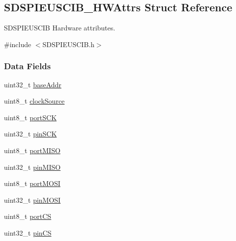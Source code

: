 \subsection{S\+D\+S\+P\+I\+E\+U\+S\+C\+I\+B\+\_\+\+H\+W\+Attrs Struct Reference}
\label{struct_s_d_s_p_i_e_u_s_c_i_b___h_w_attrs}


S\+D\+S\+P\+I\+E\+U\+S\+C\+I\+B Hardware attributes.  




{\ttfamily \#include $<$S\+D\+S\+P\+I\+E\+U\+S\+C\+I\+B.\+h$>$}

\subsubsection*{Data Fields}
\begin{DoxyCompactItemize}
\item 
uint32\+\_\+t \hyperlink{struct_s_d_s_p_i_e_u_s_c_i_b___h_w_attrs_afd8979c081ca348a10f1894eb647cb55}{base\+Addr}
\item 
uint8\+\_\+t \hyperlink{struct_s_d_s_p_i_e_u_s_c_i_b___h_w_attrs_a9679db27cd498a286edd0fa472d9ecdd}{clock\+Source}
\item 
uint8\+\_\+t \hyperlink{struct_s_d_s_p_i_e_u_s_c_i_b___h_w_attrs_a06794ada31d2570b7ec9f6cf17b40eda}{port\+S\+C\+K}
\item 
uint32\+\_\+t \hyperlink{struct_s_d_s_p_i_e_u_s_c_i_b___h_w_attrs_acf04a6e03db4580245427e6b71e86b3d}{pin\+S\+C\+K}
\item 
uint8\+\_\+t \hyperlink{struct_s_d_s_p_i_e_u_s_c_i_b___h_w_attrs_a07a2ae46993c19e425d0ed690ceace8e}{port\+M\+I\+S\+O}
\item 
uint32\+\_\+t \hyperlink{struct_s_d_s_p_i_e_u_s_c_i_b___h_w_attrs_a03fb1a364c99bac2010c533553f6ffcc}{pin\+M\+I\+S\+O}
\item 
uint8\+\_\+t \hyperlink{struct_s_d_s_p_i_e_u_s_c_i_b___h_w_attrs_ab6f2f052acf4fbc2469b84dfd5a3a7fd}{port\+M\+O\+S\+I}
\item 
uint32\+\_\+t \hyperlink{struct_s_d_s_p_i_e_u_s_c_i_b___h_w_attrs_a76e4ea3cba4e266ff0699f85d7bd042a}{pin\+M\+O\+S\+I}
\item 
uint8\+\_\+t \hyperlink{struct_s_d_s_p_i_e_u_s_c_i_b___h_w_attrs_ac7a742be07f6c2d4cd75f3c1e0cb62db}{port\+C\+S}
\item 
uint32\+\_\+t \hyperlink{struct_s_d_s_p_i_e_u_s_c_i_b___h_w_attrs_acbca6e53d49d2367d170d54add9ababd}{pin\+C\+S}
\end{DoxyCompactItemize}


